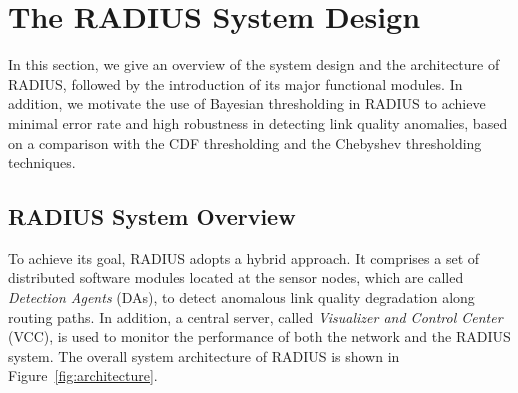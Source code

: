 \section{The RADIUS System Design}\label{sec:system}
In this section, we give an overview of the system design and the architecture of RADIUS, followed by the introduction of its major functional modules. In addition, we motivate the use of Bayesian thresholding in RADIUS to achieve minimal error rate and high robustness in detecting link quality anomalies, based on a comparison with the CDF thresholding and the Chebyshev thresholding techniques.  



\subsection{RADIUS System Overview}
To achieve its goal, RADIUS adopts a hybrid approach. It comprises a set of distributed software modules located at the sensor nodes, which are called \textit{Detection Agents} (DAs), to detect anomalous link quality degradation along routing paths. In addition, a central server, called \textit{Visualizer and Control Center} (VCC), is used to monitor the performance of both the network and the RADIUS system. The overall system architecture of RADIUS is shown in Figure~\ref{fig:architecture}.



